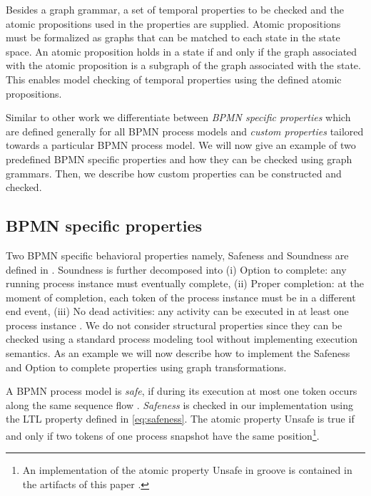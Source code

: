 \documentclass[adraft, copyright, creativecommons]{eptcs} %
\begin{document}
Besides a graph grammar, a set of temporal properties to be checked and the atomic propositions used in the properties are supplied.
Atomic propositions must be formalized as graphs that can be matched to each state in the state space.
An atomic proposition holds in a state if and only if the graph associated with the atomic proposition is a subgraph of the graph associated with the state. %
This enables model checking of temporal properties using the defined atomic propositions.

Similar to other work we differentiate between \emph{BPMN specific properties} which are defined generally for all BPMN process models and \emph{custom properties} tailored towards a particular BPMN process model.
We will now give an example of two predefined BPMN specific properties and how they can be checked using graph grammars.
Then, we describe how custom properties can be constructed and checked.

\subsection{BPMN specific properties}
Two BPMN specific behavioral properties namely, Safeness and Soundness are defined in \cite{corradiniClassificationBPMNCollaborations2018}.
Soundness is further decomposed into (i) Option to complete: any running process instance must eventually complete, (ii) Proper completion: at the moment of completion, each token of the process instance must be in a different end event, (iii) No dead activities: any activity can be executed in at least one process instance \cite{corradiniClassificationBPMNCollaborations2018}.
We do not consider structural properties since they can be checked using a standard process modeling tool without implementing execution semantics.
As an example we will now describe how to implement the Safeness and Option to complete properties using graph transformations.

A BPMN process model is \emph{safe}, if during its execution at most one token occurs along the same sequence flow \cite{corradiniClassificationBPMNCollaborations2018}.
\emph{Safeness} is checked in our implementation using the LTL property defined in \eqref{eq:safeness}.
The atomic property \textsf{Unsafe} is true if and only if two tokens of one process snapshot have the same position\footnote{An implementation of the atomic property \textsf{Unsafe} in groove is contained in the artifacts of this paper \cite{ArtifactsTERMGRAPH2022}.}.
\end{document}
